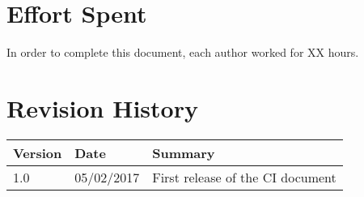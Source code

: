 \documentclass[11pt,a4paper]{report}
\begin{document}
\chapter{Effort Spent}
In order to complete this document, each author worked for XX hours.
\chapter{Revision History}
\begin{tabularx}{\textwidth}{|l|l|X|}
	\hline
	Version & Date & Summary\\
	\hline
	1.0 & 05/02/2017 & First release of the CI document\\
	\hline
\end{tabularx}
\end{document}
